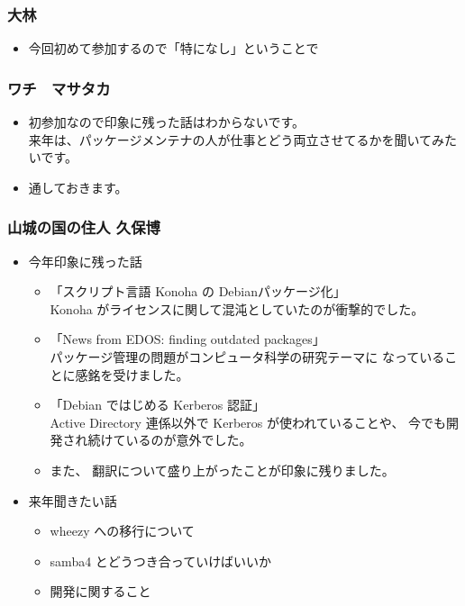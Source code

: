 \documentclass[cjk,dvipdfmx,10pt,compress,%
hyperref={bookmarks=true,bookmarksnumbered=true,bookmarksopen=false,%
colorlinks=false,%
pdftitle={第 67 回 関西 Debian 勉強会},%
pdfauthor={倉敷・のがた・佐々木・かわだ},%
pdfsubject={資料},%
}]{beamer}
\begin{document}
\begin{frame}
  \frametitle{ 大林 }
  \begin{itemize}
  \item 今回初めて参加するので「特になし」ということで
  \end{itemize}
\end{frame}

\begin{frame}
  \frametitle{ ワチ　マサタカ }
  \begin{itemize}
  \item 初参加なので印象に残った話はわからないです。\\
    来年は、パッケージメンテナの人が仕事とどう両立させてるかを聞いてみたいです。
  \item 通しておきます。
  \end{itemize}
\end{frame}

\begin{frame}
  \frametitle{ 山城の国の住人 久保博 }
  \begin{itemize}
  \item 今年印象に残った話
    \begin{itemize}
    \item 「スクリプト言語 Konoha の Debianパッケージ化」\mbox{~}\\
      Konoha がライセンスに関して混沌としていたのが衝撃的でした。
    \item 「News from EDOS: finding outdated packages」\mbox{~}\\
      パッケージ管理の問題がコンピュータ科学の研究テーマに
      なっていることに感銘を受けました。
    \item 「Debian ではじめる Kerberos 認証」\mbox{~}\\
      Active Directory 連係以外で Kerberos が使われていることや、
      今でも開発され続けているのが意外でした。
    \item また、
      翻訳について盛り上がったことが印象に残りました。
    \end{itemize}
  \item 来年聞きたい話
    \begin{itemize}
    \item wheezy への移行について
    \item samba4 とどうつき合っていけばいいか
    \item 開発に関すること
    \end{itemize}
  \end{itemize}
\end{frame}
\end{document}
